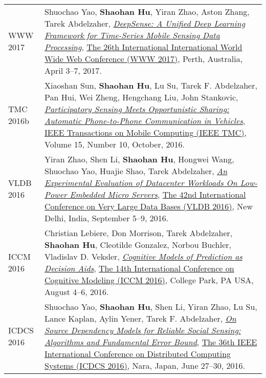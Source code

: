 \begin{longtabu}{p{.51\sectionwidth} p{.78\resumewidth}}
{\sc WWW 2017}\hypertarget{yao2017www}{} &
Shuochao Yao, \textbf{Shaohan Hu}, Yiran Zhao, Aston Zhang, Tarek Abdelzaher,
\href{http://dl.acm.org/citation.cfm?id=3052577}{\emph{DeepSense: A Unified Deep Learning Framework for Time-Series Mobile Sensing Data Processing}},
\href{http://www.www2017.com.au/}{\textsf{The 26th International International World Wide Web Conference (WWW 2017)}},
Perth, Australia, April 3--7, 2017. \\

{\sc TMC 2016b}\hypertarget{hu2015tmc}{} &
Xiaoshan Sun, \textbf{Shaohan Hu}, Lu Su, Tarek F. Abdelzaher, Pan Hui, Wei Zheng, Hengchang Liu, John Stankovic,
\href{http://ieeexplore.ieee.org/document/7337442}{\emph{Participatory Sensing Meets Opportunistic Sharing: Automatic Phone-to-Phone Communication in Vehicles}},
\href{http://www.computer.org/web/tmc}{\textsf{IEEE Transactions on Mobile Computing (IEEE TMC)}},
Volume 15, Number 10, October, 2016. \\

{\sc VLDB 2016}\hypertarget{zhao2016vldb}{} &
Yiran Zhao, Shen Li, \textbf{Shaohan Hu}, Hongwei Wang, Shuochao Yao, Huajie Shao, Tarek Abdelzaher,
\href{http://dl.acm.org/citation.cfm?id=2947625}{\emph{An Experimental Evaluation of Datacenter Workloads On Low-Power Embedded Micro Servers}},
\href{http://vldb2016.persistent.com/}{\textsf{The 42nd International Conference on Very Large Data Bases (VLDB 2016)}},
New Delhi, India, September 5--9, 2016. \\

{\sc ICCM 2016}\hypertarget{Lebiere2016iccm}{} &
Christian Lebiere, Don Morrison, Tarek Abdelzaher, \textbf{Shaohan Hu}, Cleotilde Gonzalez, Norbou Buchler, Vladislav D. Veksler,
\href{http://acs.ist.psu.edu/iccm2016/proceedings/lebiere2016iccm.pdf}{\emph{Cognitive Models of Prediction as Decision Aids}},
\href{http://acs.ist.psu.edu/iccm2016/}{\textsf{The 14th International Conference on Cognitive Modeling (ICCM 2016)}},
College Park, PA USA, August 4--6, 2016. \\

{\sc ICDCS 2016}\hypertarget{yao2016icdcs}{} &
Shuochao Yao, \textbf{Shaohan Hu}, Shen Li, Yiran Zhao, Lu Su, Lance Kaplan, Aylin Yener, Tarek F. Abdelzaher,
\href{http://ieeexplore.ieee.org/document/7536545}{\emph{On Source Dependency Models for Reliable Social Sensing: Algorithms and Fundamental Error Bound}},
\href{http://www-higashi.ist.osaka-u.ac.jp/icdcs2016/}{\textsf{The 36th IEEE International Conference on Distributed Computing Systems (ICDCS 2016)}},
Nara, Japan, June 27--30, 2016. \\


\end{longtabu}
